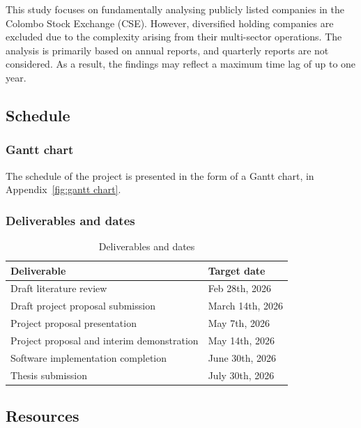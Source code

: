 This study focuses on fundamentally analysing publicly listed companies in the Colombo Stock Exchange (CSE). However, diversified holding companies are excluded due to the complexity arising from their multi-sector operations. The analysis is primarily based on annual reports, and quarterly reports are not considered. As a result, the findings may reflect a maximum time lag of up to one year. 

\subsection{Schedule}

\subsubsection{Gantt chart}

The schedule of the project is presented in the form of a Gantt chart, in Appendix~\ref{fig:gantt chart}.

\subsubsection{Deliverables and dates}

\begin{table}[H]
    \centering
    \begin{tabular}{|l|l|}
        \hline
        Deliverable & Target date \\
        \hline
        Draft literature review  & Feb 28th, 2026  \\
        \hline
        Draft project proposal submission  & March 14th, 2026  \\
        \hline
        Project proposal presentation  & May 7th, 2026  \\
        \hline
        Project proposal and interim demonstration  & May 14th, 2026  \\
        \hline
        Software implementation completion & June 30th, 2026  \\
        \hline
        Thesis submission  & July 30th, 2026 \\
        \hline
    \end{tabular}
    \caption{Deliverables and dates}
    \label{tab:project-schedule}
\end{table}

\subsection{Resources}

